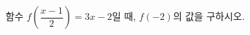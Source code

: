 \hspace*{2mm}\begin{minipage}[t]{\dimexpr\linewidth-2mm\relax}\vspace{0pt}
함수 $f\left(\dfrac{x-1}{2}\right)=3x-2$일 때, $f(-2)$의 값을 구하시오.\end{minipage}
